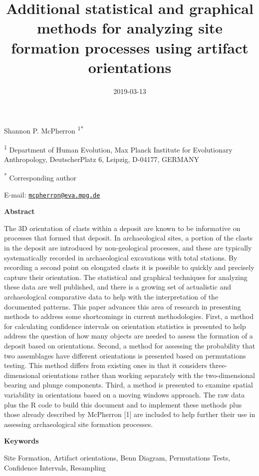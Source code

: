 \documentclass[]{article}
\title{Additional statistical and graphical methods for analyzing site
formation processes using artifact orientations}
\author{}
\date{2019-03-13}
\begin{document}
\maketitle

Shannon P. McPherron \textsuperscript{1*}

\textsuperscript{1} Department of Human Evolution, Max Planck Institute
for Evolutionary Anthropology, DeutscherPlatz 6, Leipzig, D-04177,
GERMANY

\textsuperscript{*} Corresponding author

E-mail:
\href{mailto:mcpherron@eva.mpg.de}{\nolinkurl{mcpherron@eva.mpg.de}}

\pagebreak
\linenumbers

\textbf{Abstract}

The 3D orientation of clasts within a deposit are known to be
informative on processes that formed that deposit. In archaeological
sites, a portion of the clasts in the deposit are introduced by
non-geological processes, and these are typically systematically
recorded in archaeological excavations with total stations. By recording
a second point on elongated clasts it is possible to quickly and
precisely capture their orientation. The statistical and graphical
techniques for analyzing these data are well published, and there is a
growing set of actualistic and archaeological comparative data to help
with the interpretation of the documented patterns. This paper advances
this area of research in presenting methods to address some shortcomings
in current methodologies. First, a method for calculating confidence
intervals on orientation statistics is presented to help address the
question of how many objects are needed to assess the formation of a
deposit based on orientations. Second, a method for assessing the
probability that two assemblages have different orientations is
presented based on permutations testing. This method differs from
existing ones in that it considers three-dimensional orientations rather
than working separately with the two-dimensional bearing and plunge
components. Third, a method is presented to examine spatial variability
in orientations based on a moving windows approach. The raw data plus
the R code to build this document and to implement these methods plus
those already described by McPherron {[}1{]} are included to help
further their use in assessing archaeological site formation processes.

\textbf{Keywords}

Site Formation, Artifact orientations, Benn Diagram, Permutations Tests,
Confidence Intervals, Resampling
\end{document}
